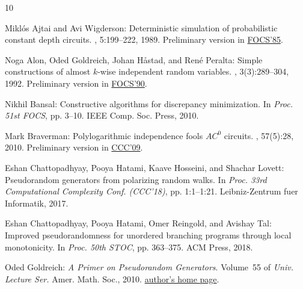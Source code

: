 \documentclass[11pt]{article}
\numberwithin{equation}{section}
\theoremstyle{definition}
\theoremstyle{plain}
\begin{document}
\tocrefpdfbookmark
\begin{thebibliography}{10}

{\sc Mikl{\'o}s Ajtai and Avi Wigderson}: Deterministic simulation of
  probabilistic constant depth circuits.
, 5:199--222, 1989.
\newblock Preliminary version in
  \href{https://doi.org/10.1109/SFCS.1985.19}{FOCS'85}.

{\sc Noga Alon, Oded Goldreich, Johan H{\aa}stad, and Ren{\'e} Peralta}: Simple
  constructions of almost $k$-wise independent random variables.
, 3(3):289--304, 1992.
\newblock Preliminary version in
  \href{https://ieeexplore.ieee.org/document/89575}{FOCS'90}.

{\sc Nikhil Bansal}: Constructive algorithms for discrepancy minimization.
\newblock In {\em Proc. 51st FOCS}, pp. 3--10. IEEE Comp. Soc. Press, 2010.

{\sc Mark Braverman}: Polylogarithmic independence fools ${AC}^0$ circuits.
, 57(5):28, 2010.
\newblock Preliminary version in
  \href{https://ieeexplore.ieee.org/document/5231177}{CCC'09}.
\newblock [\epfmtdoi{10.1145/1754399.1754401}]

{\sc Eshan Chattopadhyay, Pooya Hatami, Kaave Hosseini, and Shachar Lovett}:
  Pseudorandom generators from polarizing random walks.
\newblock In {\em Proc. 33rd Computational Complexity Conf. (CCC'18)}, pp.
  1:1--1:21. Leibniz-Zentrum fuer Informatik, 2017.

{\sc Eshan Chattopadhyay, Pooya Hatami, Omer Reingold, and Avishay Tal}:
  Improved pseudorandomness for unordered branching programs through local
  monotonicity.
\newblock In {\em Proc. 50th STOC}, pp. 363--375. ACM Press, 2018.
\newblock [\epfmtdoi{10.1145/3188745.3188800}]

{\sc Oded Goldreich}: {\em A Primer on Pseudorandom Generators}.
\newblock Volume~55 of {\em Univ. Lecture Ser.}
\newblock Amer. Math. Soc., 2010.
\newblock
  \href{http://www.wisdom.weizmann.ac.il/~oded/prg-primer.html}{author's home
  page}.


\end{thebibliography}
\end{document}
